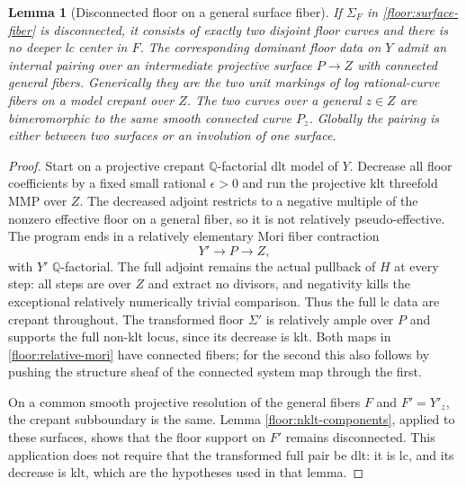 \documentclass[11pt,letterpaper]{article}
\newtheorem{lemma}[theorem]{Lemma}
\theoremstyle{definition}
\theoremstyle{remark}
\begin{document}
\begin{lemma}[Disconnected floor on a general surface fiber]
\label{floor:disconnected-fiber}
If $\Sigma_F$ in \eqref{floor:surface-fiber} is
disconnected, it consists of exactly two disjoint
floor curves and there is no deeper lc center in
$F$.  The corresponding dominant floor data on
$Y$ admit an internal pairing over an intermediate
projective surface $P\to Z$ with connected general
fibers.  Generically they are the two unit markings
of log rational-curve fibers on a model crepant
over $Z$.  The two curves over a general $z\in Z$
are bimeromorphic to the same smooth connected
curve $P_z$.  Globally the pairing is either
between two surfaces or an involution of one
surface.
\end{lemma}

\begin{proof}
Start on a projective crepant $\mathbb{Q}$-factorial dlt
model of $Y$.  Decrease all floor coefficients
by a fixed small rational $\epsilon>0$ and run
the projective klt threefold MMP over $Z$.
The decreased adjoint restricts to a negative
multiple of the nonzero effective floor on
a general fiber, so it is not relatively
pseudo-effective.  The program ends in a
relatively elementary Mori fiber contraction
\begin{equation}
 \label{floor:relative-mori}
 Y'\longrightarrow P\longrightarrow Z,
\end{equation}
with $Y'$ $\mathbb{Q}$-factorial.  The full adjoint
remains the actual pullback of $H$ at every
step: all steps are over $Z$ and extract no
divisors, and negativity kills the exceptional
relatively numerically trivial comparison.
Thus the full lc data are crepant throughout.
The transformed floor $\Sigma'$ is relatively
ample over $P$ and supports the full non-klt
locus, since its decrease is klt.  Both maps
in \eqref{floor:relative-mori} have connected
fibers; for the second this also follows by
pushing the structure sheaf of the connected
system map through the first.

On a common smooth projective resolution of
the general fibers $F$ and $F'=Y'_z$, the
crepant subboundary is the same.  Lemma
\ref{floor:nklt-components}, applied to these
surfaces, shows that the floor support on
$F'$ remains disconnected.  This application
does not require that the transformed full
pair be dlt: it is lc, and its decrease is
klt, which are the hypotheses used in that
lemma.


\end{proof}
\end{document}
